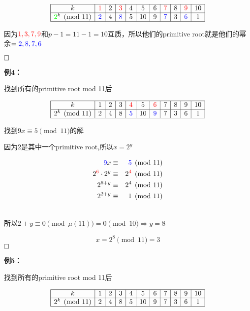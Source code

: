 \documentclass{article}
\begin{document}
$$
\begin{array}{|c|c|c|c|c|c|c|c|c|c|c|}
\hline 
k & {\color{red}1}&2 &{\color{red}3} &4 &5 &6 &{\color{red}7} &8 &{\color{red}9}&10 \\
\hline 
{\color{green}2}^k \pmod{11} &{\color{blue}2}&4&{\color{blue}8}&5&10&9&{\color{blue}7}&3&{\color{blue}6}&1\\
\hline 
\end{array}
$$

因为${\color{red}{1,3,7,9}}$和$p-1 = 11 -1 = 10 $互质，所以他们的primitive root就是他们的幂余$= {\color{blue}{2,8,7,6}}$

$\hfill\square$

\textbf{例4：}


找到所有的primitive root mod 11后

$$
\begin{array}{|c|c|c|c|c|c|c|c|c|c|c|}
\hline 
k & 1&2 &3&{\color{red}4} &5 &{\color{red}6} &7 &8 &9&10 \\
\hline 
2^k \pmod{11} &2&4&8&{\color{blue}5}&10&{\color{blue}9}&7&3&6&1\\
\hline 
\end{array}
$$

找到$9x \equiv 5 \pmod{11}$的解

因为2是其中一个primitive root,所以$x=2^y$

\begin{eqnarray}   
\label{eq}
{\color{blue}9}x  &\equiv& {\color{blue}5} \pmod{11} \nonumber \\
2^{{\color{red}6}} \cdot 2^y &\equiv& 2^{{\color{red}4}} \pmod{11}\nonumber \\
2^{6+y} &\equiv& 2^4 \pmod{11}\nonumber \\
2^{2+y} &\equiv& 1 \pmod{11}\nonumber \\
\nonumber 
\end{eqnarray}

所以$2+y \equiv 0 \pmod{\mu(11)} = 0 \pmod{10} \Rightarrow y = 8$    

$$x = 2^8 \pmod{11} = 3$$
$\hfill\square$ 


\textbf{例5：}


找到所有的primitive root mod 11后

$$
\begin{array}{|c|c|c|c|c|c|c|c|c|c|c|}
\hline 
k & 1&2 &3&4 &5 &6 &7 &8 &9&10 \\
\hline 
2^k \pmod{11} &2&4&8&5&10&9&7&3&6&1\\
\hline 
\end{array}
$$
\end{document}

